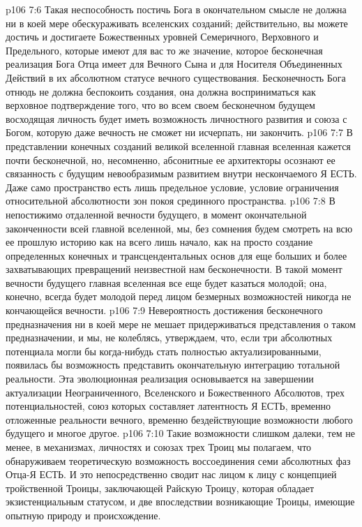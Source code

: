 \vs p106 7:6 Такая неспособность постичь Бога в окончательном смысле не должна ни в коей мере обескураживать вселенских созданий; действительно, вы можете достичь и достигаете Божественных уровней Семеричного, Верховного и Предельного, которые имеют для вас то же значение, которое бесконечная реализация Бога Отца имеет для Вечного Сына и для Носителя Объединенных Действий в их абсолютном статусе вечного существования. Бесконечность Бога отнюдь не должна беспокоить создания, она должна восприниматься как верховное подтверждение того, что во всем своем бесконечном будущем восходящая личность будет иметь возможность личностного развития и союза с Богом, которую даже вечность не сможет ни исчерпать, ни закончить.
\vs p106 7:7 \pc В представлении конечных созданий великой вселенной главная вселенная кажется почти бесконечной, но, несомненно, абсонитные ее архитекторы осознают ее связанность с будущим невообразимым развитием внутри нескончаемого Я ЕСТЬ. Даже само пространство есть лишь предельное условие, условие ограничения  относительной абсолютности зон покоя срединного пространства.
\vs p106 7:8 В непостижимо отдаленной вечности будущего, в момент окончательной законченности всей главной вселенной, мы, без сомнения будем смотреть на всю ее прошлую историю как на всего лишь начало, как на просто создание определенных конечных и трансцендентальных основ для еще больших и более захватывающих превращений неизвестной нам бесконечности. В такой момент вечности будущего главная вселенная все еще будет казаться молодой; она, конечно, всегда будет молодой перед лицом безмерных возможностей никогда не кончающейся вечности.
\vs p106 7:9 \pc Невероятность достижения бесконечного предназначения ни в коей мере не мешает придерживаться представления о таком предназначении, и мы, не колеблясь, утверждаем, что, если три абсолютных потенциала могли бы когда\hyp{}нибудь стать полностью актуализированными, появилась бы возможность представить окончательную интеграцию тотальной реальности. Эта эволюционная реализация основывается на завершении актуализации Неограниченного, Вселенского и Божественного Абсолютов, трех потенциальностей, союз которых составляет латентность Я ЕСТЬ, временно отложенные реальности вечного, временно бездействующие возможности любого будущего и многое другое.
\vs p106 7:10 Такие возможности слишком далеки, тем не менее, в механизмах, личностях и союзах трех Троиц мы полагаем, что обнаруживаем теоретическую возможность воссоединения семи абсолютных фаз Отца\hyp{}Я ЕСТЬ. И это непосредственно сводит нас лицом к лицу с концепцией тройственной Троицы, заключающей Райскую Троицу, которая обладает экзистенциальным статусом, и две впоследствии возникающие Троицы, имеющие опытную природу и происхождение.

